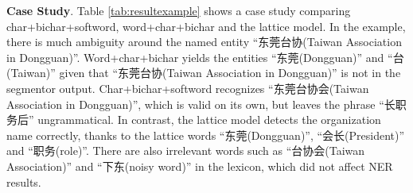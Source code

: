 \documentclass[11pt,a4paper]{article}
\begin{document}
\begin{CJK*}{UTF8}{gbsn}
\begin{table}[!t] 
  \caption{Example. Red and green represent incorrect and correct entities, respectively.}
  \label{tab:resultexample}
\end{table}

\noindent \textbf{Case Study}. Table \ref{tab:resultexample} shows a case study comparing char+bichar+softword, word+char+bichar and the lattice model. In the example, there is much ambiguity around the named entity ``东莞台协\;(Taiwan Association in Dongguan)''. Word+char+bichar yields the entities ``东莞\;(Dongguan)'' and ``台\;(Taiwan)'' given that ``东莞台协\;(Taiwan Association in Dongguan)'' is not in the segmentor output. Char+bichar+softword recognizes ``东莞台协会\;(Taiwan Association in Dongguan)'', which is valid on its own, but leaves the phrase ``长职务后'' ungrammatical. In contrast, the lattice model detects the organization name correctly, thanks to the lattice words ``东莞\;(Dongguan)'', ``会长\;(President)'' and ``职务\;(role)''. There are also irrelevant words such as ``台协会\;(Taiwan Association)'' and ``下东\;(noisy word)'' in the lexicon, which did not affect NER results.


\end{CJK*}
\end{document}
